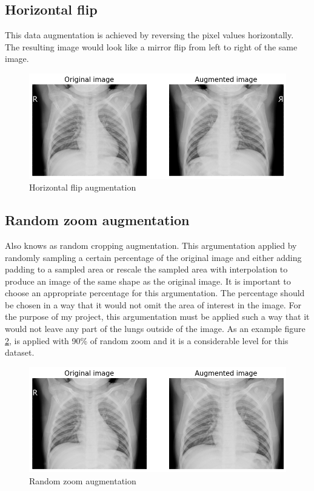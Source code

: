 \subsection{Horizontal flip} \label{subsec:horizontalflip}
This data augmentation is achieved by reversing the pixel values horizontally.
The resulting image would look like a mirror flip from left to right of the same image.

\begin{figure}[H]
    \centering
    \includegraphics[width=\textwidth]{img/augmented-image-1588951788.png}
    \caption{Horizontal flip augmentation}
    \label{fig:horizontalflipxray}
\end{figure}

\subsection{Random zoom augmentation} \label{subsec:randomzoom}
Also knows as random cropping augmentation.
This argumentation applied by randomly sampling a certain percentage of the original image and either adding padding to a sampled area or rescale the sampled area with interpolation to produce an image of the same shape as the original image.
It is important to choose an appropriate percentage for this argumentation.
The percentage should be chosen in a way that it would not omit the area of interest in the image.
For the purpose of my project, this argumentation must be applied such a way that it would not leave any part of the lungs outside of the image. 
As an example figure \ref{fig:randomzoomxray}, is applied with 90\% of random zoom and it is a considerable level for this dataset.

\begin{figure}[H]
    \centering
    \includegraphics[width=\textwidth]{img/augmented-image-1588951794.png}
    \caption{Random zoom augmentation}
    \label{fig:randomzoomxray}
\end{figure}

